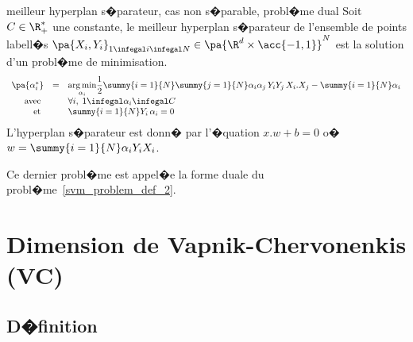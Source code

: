             \begin{xproblem}{meilleur hyperplan s�parateur, cas non s�parable, probl�me dual}
            \label{svm_problem_def_2p}
            Soit $C \in \R^*_+$ une constante,
            le meilleur hyperplan s�parateur de l'ensemble de points labell�s
            $\pa{X_i,Y_i}_{1 \infegal i \infegal N} \in \pa{ \R^d \times \acc{-1,1} }^N$ est la solution
            d'un probl�me de minimisation. 
                    $$
                    \begin{array}{rcl}    \pa{\alpha_i^*} &=& \underset{\alpha_i}{\arg \min} \dfrac{1}{2}  
                                                                                    \summy{i=1}{N}\summy{j=1}{N}
                                                                                            \alpha_i \alpha_j \,
                                                                                            Y_i Y_j \,
                                                                                            X_i . X_j
                                                                                    - \summy{i=1}{N} \alpha_i \\
                                         \text{avec }      && \forall i, \; 1 \infegal \alpha_i \infegal C \\
                                         \text{et }          && \summy{i=1}{N} Y_i \, \alpha_i = 0
                    \end{array}                                        
                    $$
            L'hyperplan s�parateur est donn� par l'�quation $ x.w + b = 0$ o� 
            $w = \summy{i=1}{N} \alpha_i Y_i X_i$.
            \end{xproblem}

Ce dernier probl�me est appel�e la forme duale du probl�me~\ref{svm_problem_def_2}.

\section{Dimension de Vapnik-Chervonenkis (VC)}
\label{svm_dimension_vc}



\subsection{D�finition}

